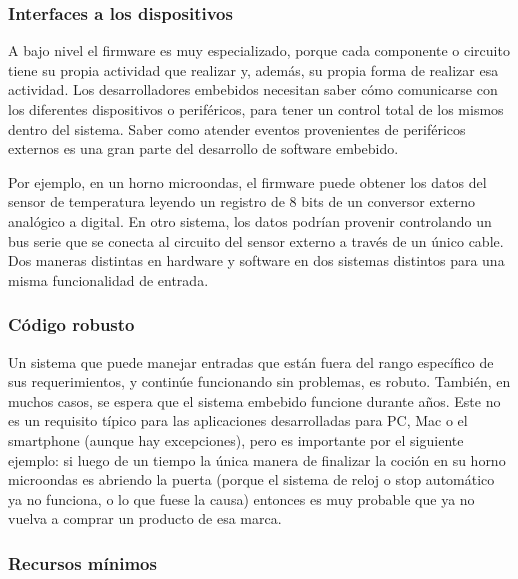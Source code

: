 \documentclass[output=paper, 
colorlinks,
citecolor=brown,
newtxmath
]{langscibook}
\begin{document}
\subsubsection {Interfaces a los dispositivos}

A bajo nivel el firmware es muy especializado, porque cada componente o circuito 
tiene su propia actividad que realizar y, además, su propia forma de realizar esa actividad. 
Los desarrolladores embebidos necesitan saber cómo comunicarse con 
los diferentes dispositivos o periféricos, para tener un control total de los mismos dentro
del sistema. Saber como atender eventos provenientes de periféricos externos es una gran 
parte del desarrollo de software embebido.

Por ejemplo, en un horno microondas, el firmware puede obtener los datos 
del sensor de temperatura leyendo un registro de 8 bits de un 
conversor externo analógico a digital. En otro sistema, los datos 
podrían provenir controlando un bus serie que se conecta al 
circuito del sensor externo a través de un único cable.
Dos maneras distintas en hardware y software en dos sistemas distintos
para una misma funcionalidad de entrada.


\subsubsection {Código robusto}

Un sistema que puede manejar entradas que están fuera del rango
específico de sus requerimientos, y continúe funcionando 
sin problemas, es robuto.
También, en muchos casos, se espera que el sistema embebido funcione durante años.
Este no es un requisito típico para las aplicaciones desarrolladas para PC, Mac o el smartphone (aunque hay excepciones),
pero es importante por el siguiente ejemplo: si luego de un tiempo la única manera de finalizar la
coción en su horno microondas es abriendo la puerta (porque el sistema de reloj o stop automático ya no funciona,
o lo que fuese la causa) entonces es muy probable
que ya no vuelva a comprar un producto de esa marca.





\subsubsection {Recursos mínimos}
\end{document}
